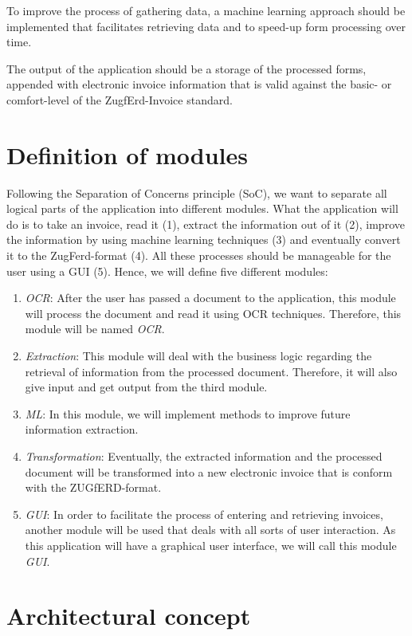To improve the process of gathering data, a machine learning approach should be implemented that facilitates retrieving data and to speed-up form processing over time.

The output of the application should be a storage of the processed forms, appended with electronic invoice information that is valid against the basic- or comfort-level of the ZugfErd-Invoice standard.

\section{Definition of modules}
\label{sec5.2}

Following the Separation of Concerns principle (SoC), we want to separate all logical parts of the application into different modules.
What the application will do is to take an invoice, read it (1), extract the information out of it (2), improve the information by using machine learning techniques (3) and eventually convert it to the ZugFerd-format (4). All these processes should be manageable for the user using a GUI (5).
Hence, we will define five different modules:
\begin{enumerate}
	\item \emph{OCR}: After the user has passed a document to the application, this module will process the document and read it using OCR techniques. Therefore, this module will be named \emph{OCR}.
	\item \emph{Extraction}: This module will deal with the business logic regarding the retrieval of information from the processed document. Therefore, it will also give input and get output from the third module.
	\item \emph{ML}: In this module, we will implement methods to improve future information extraction.
	\item \emph{Transformation}: Eventually, the extracted information and the processed document will be transformed into a new electronic invoice that is conform with the ZUGfERD-format.
	\item \emph{GUI}: In order to facilitate the process of entering and retrieving invoices, another module will be used that deals with all sorts of user interaction. As this application will have a graphical user interface, we will call this module \emph{GUI}.
\end{enumerate}

\section{Architectural concept}
\label{sec5.3}

